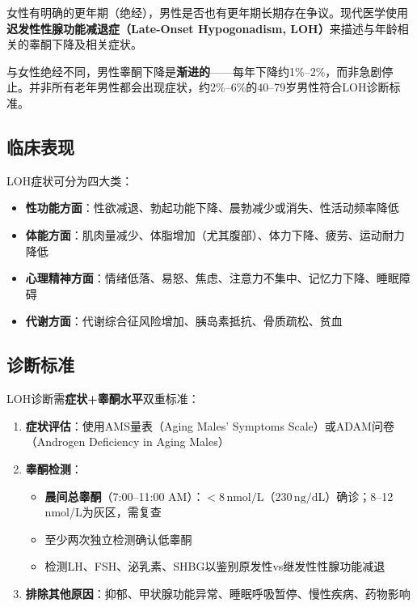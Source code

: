 \begin{enumerate}
女性有明确的更年期（绝经），男性是否也有更年期长期存在争议。现代医学使用\textbf{迟发性性腺功能减退症（Late-Onset Hypogonadism, LOH）}来描述与年龄相关的睾酮下降及相关症状。

与女性绝经不同，男性睾酮下降是\textbf{渐进的}——每年下降约1\%--2\%，而非急剧停止。并非所有老年男性都会出现症状，约2\%--6\%的40--79岁男性符合LOH诊断标准。

\subsection{临床表现}

LOH症状可分为四大类：

\begin{itemize}[leftmargin=2cm]
	\item \textbf{性功能方面}：性欲减退、勃起功能下降、晨勃减少或消失、性活动频率降低
	\item \textbf{体能方面}：肌肉量减少、体脂增加（尤其腹部）、体力下降、疲劳、运动耐力降低
	\item \textbf{心理精神方面}：情绪低落、易怒、焦虑、注意力不集中、记忆力下降、睡眠障碍
	\item \textbf{代谢方面}：代谢综合征风险增加、胰岛素抵抗、骨质疏松、贫血
\end{itemize}

\subsection{诊断标准}

LOH诊断需\textbf{症状+睾酮水平}双重标准：

\begin{enumerate}
	\item \textbf{症状评估}：使用AMS量表（Aging Males' Symptoms Scale）或ADAM问卷（Androgen Deficiency in Aging Males）
	\item \textbf{睾酮检测}：
		\begin{itemize}
		\item \textbf{晨间总睾酮}（7:00--11:00 AM）：$<8\,\mathrm{nmol/L}$（$230\,\mathrm{ng/dL}$）确诊；8--12 nmol/L为灰区，需复查
		\item 至少两次独立检测确认低睾酮
		\item 检测LH、FSH、泌乳素、SHBG以鉴别原发性vs继发性性腺功能减退
		\end{itemize}
	\item \textbf{排除其他原因}：抑郁、甲状腺功能异常、睡眠呼吸暂停、慢性疾病、药物影响
\end{enumerate}


\end{enumerate}
